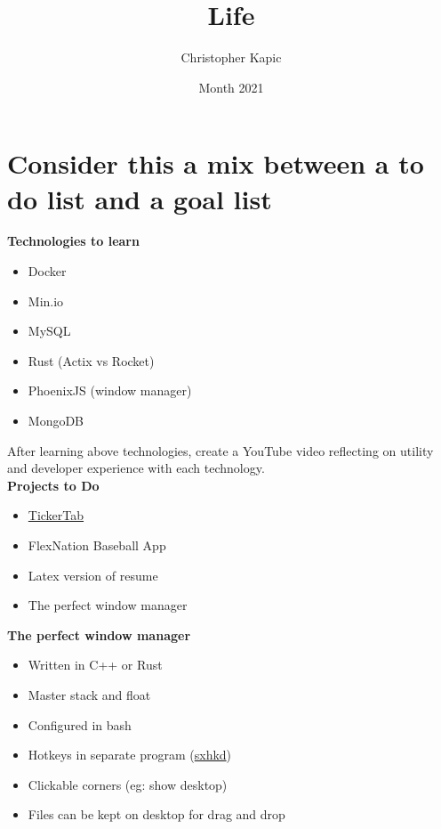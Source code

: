 \documentclass{article}
\title{Life}
\author{Christopher Kapic}
\date{Month 2021}
\begin{document}
\maketitle

\section*{Consider this a mix between a to do list and a goal list}
\textbf{Technologies to learn}
\begin{itemize}
    \item Docker
    \item Min.io
    \item MySQL
    \item Rust (Actix vs Rocket)
    \item PhoenixJS (window manager)
    \item MongoDB
\end{itemize}

After learning above technologies, create a YouTube video reflecting on utility and developer experience with each technology. \vspace{.1in} \\
\textbf{Projects to Do}
\begin{itemize}
    \item \href{https://tickertab.io/}{TickerTab}
    \item FlexNation Baseball App
    \item Latex version of resume
    \item The perfect window manager
\end{itemize}
\vspace{.1in}
\textbf{The perfect window manager}
\begin{itemize}
    \item Written in C++ or Rust
    \item Master stack and float
    \item Configured in bash
    \item Hotkeys in separate program (\href{https://github.com/baskerville/sxhkd}{sxhkd})
    \item Clickable corners (eg: show desktop)
    \item Files can be kept on desktop for drag and drop
\end{itemize}
\end{document}
